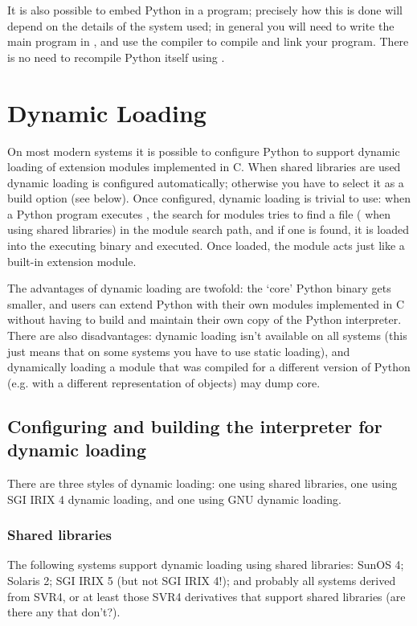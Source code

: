 It is also possible to embed Python in a \Cpp{} program; precisely how this
is done will depend on the details of the \Cpp{} system used; in general you
will need to write the main program in \Cpp{}, and use the \Cpp{} compiler
to compile and link your program.  There is no need to recompile Python
itself using \Cpp{}.


\chapter{Dynamic Loading}

On most modern systems it is possible to configure Python to support
dynamic loading of extension modules implemented in C.  When shared
libraries are used dynamic loading is configured automatically;
otherwise you have to select it as a build option (see below).  Once
configured, dynamic loading is trivial to use: when a Python program
executes , the search for modules tries to find a
file  ( when using shared
libraries) in the module search path, and if one is found, it is
loaded into the executing binary and executed.  Once loaded, the
module acts just like a built-in extension module.

The advantages of dynamic loading are twofold: the `core' Python
binary gets smaller, and users can extend Python with their own
modules implemented in C without having to build and maintain their
own copy of the Python interpreter.  There are also disadvantages:
dynamic loading isn't available on all systems (this just means that
on some systems you have to use static loading), and dynamically
loading a module that was compiled for a different version of Python
(e.g. with a different representation of objects) may dump core.


\section{Configuring and building the interpreter for dynamic loading}

There are three styles of dynamic loading: one using shared libraries,
one using SGI IRIX 4 dynamic loading, and one using GNU dynamic
loading.

\subsection{Shared libraries}

The following systems support dynamic loading using shared libraries:
SunOS 4; Solaris 2; SGI IRIX 5 (but not SGI IRIX 4!); and probably all
systems derived from SVR4, or at least those SVR4 derivatives that
support shared libraries (are there any that don't?).


